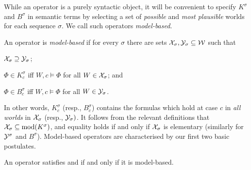 While an operator is a purely syntactic object, it will be convenient to
specify $K^\sigma$ and $B^\sigma$ in semantic terms by selecting a set of
\emph{possible} and \emph{most plausible} worlds for each sequence $\sigma$.
We call such operators \emph{model-based}.

\begin{definition}
\label{kr_def_model_based}
An operator is \emph{model-based} if for every $\sigma$ there
are sets $\mathcal{X}_\sigma, \mathcal{Y}_\sigma \subseteq \mathcal{W}$ such that
\begin{inlinelist}
    \item $\mathcal{X}_\sigma \supseteq \mathcal{Y}_\sigma$;
    \item $\Phi \in K^\sigma_c$ iff $W, c \models \Phi$ for all $W \in
          \mathcal{X}_\sigma$; and
    \item $\Phi \in B^\sigma_c$ iff $W, c \models \Phi$ for all $W \in
          \mathcal{Y}_\sigma$.
\end{inlinelist}
\end{definition}

In other words, $K^\sigma_c$ (resp., $B^\sigma_c$) contains the formulas which
hold at case $c$ in \emph{all worlds} in $\mathcal{X}_\sigma$ (resp., $\mathcal{Y}_\sigma)$. It
follows from the relevant definitions that $\mathcal{X}_\sigma \subseteq
\operatorname{mod}(K^\sigma)$, and equality holds if and only if $\mathcal{X}_\sigma$ is elementary
(similarly for $\mathcal{Y}^\sigma$ and $B^\sigma$).
%
Model-based operators are characterised by our first two basic postulates.

\begin{theorem}
\label{kr_thm_model_based_characterisation}
An operator satisfies \closure{} and \containment{} if and only if it
is model-based.
\end{theorem}

